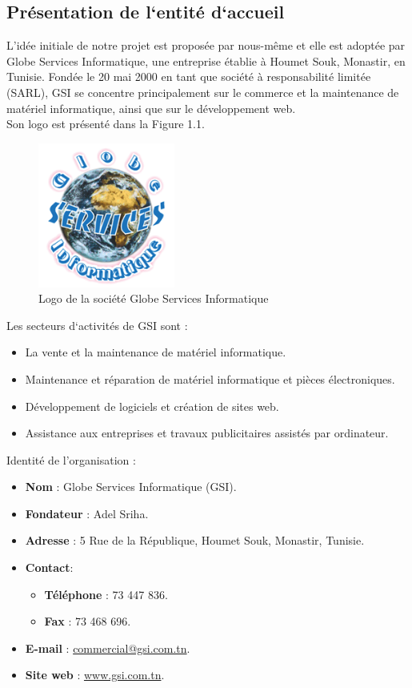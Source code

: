 \subsection{Présentation de l`entité d`accueil}
L’idée initiale de notre projet est proposée par nous-même et elle est adoptée par  Globe Services Informatique, une entreprise établie à Houmet Souk, Monastir, en Tunisie. Fondée le 20 mai 2000 en tant que société à responsabilité limitée (SARL), GSI se concentre principalement sur le commerce et la maintenance de matériel informatique, ainsi que sur le développement web.\\
Son logo est présenté dans la Figure 1.1.
\begin{figure}[H]
    \centering
    \includegraphics[width=0.4\textwidth,height=0.4\textwidth]{images/gsi-logo.png}
    \caption{Logo de la société  Globe Services Informatique }
    \label{fig:gsi-logo}    
\end{figure}

\noindent Les secteurs d`activités de GSI sont :
\begin{itemize}[itemsep=2pt, parsep=2pt]
    \item La vente et la maintenance de matériel informatique.
    \item Maintenance et réparation de matériel informatique et pièces électroniques.
    \item Développement de logiciels et création de sites web.
    \item Assistance aux entreprises et travaux publicitaires assistés par ordinateur.
\end{itemize}

\noindent Identité de l'organisation :
\begin{itemize}[itemsep=2pt, parsep=2pt]
    \item \textbf{Nom} : Globe Services Informatique (GSI).
    \item \textbf{Fondateur} : Adel Sriha.
    \item \textbf{Adresse} : 5 Rue de la République, Houmet Souk, Monastir, Tunisie.
    \item \textbf{Contact}: 
    \begin{itemize}[itemsep=2pt, parsep=2pt]
        \item \textbf{Téléphone} : 73 447 836.
        \item \textbf{Fax} : 73 468 696.
    \end{itemize}
    \item \textbf{E-mail} : \href{mailto:commercial@gsi.com.tn}{commercial@gsi.com.tn}.
    \item \textbf{Site web} : \href{https://www.gsi.com.tn/}{www.gsi.com.tn}.
\end{itemize}

